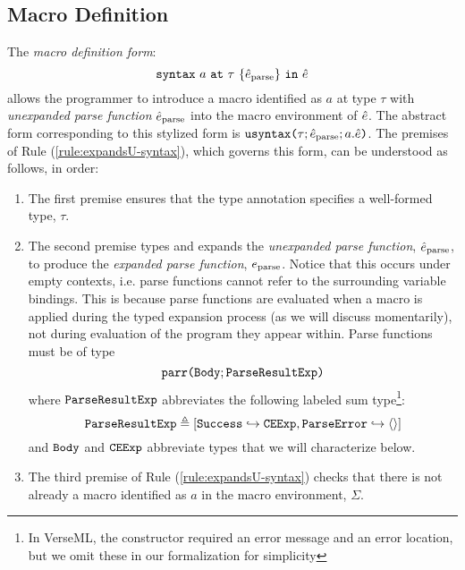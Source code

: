 \subsection{Macro Definition}
The \emph{macro definition form}: $$\texttt{syntax}~a~\texttt{at}~\tau~\{\hat{e}_\text{parse}\}~\texttt{in}~\hat{e}$$ allows the programmer to introduce a {macro} identified as $a$ at type $\tau$ with \emph{unexpanded parse function} $\hat{e}_\text{parse}$ into the macro environment of $\hat{e}$. The abstract form corresponding to this stylized form is $\texttt{usyntax}\texttt{(}\tau; \hat{e}_\text{parse}; a.\hat{e}\texttt{)}$. 
The premises of Rule (\ref{rule:expandsU-syntax}), which governs this form, can be understood as follows, in order:
\begin{enumerate}
\item The first premise ensures that the type annotation specifies a well-formed type, $\tau$.
\item The second premise types and expands the \emph{unexpanded parse function}, $\hat{e}_\text{parse}$, to produce the \emph{expanded parse function}, $e_\text{parse}$. Notice that this occurs under empty contexts, i.e. parse functions cannot refer to the surrounding variable bindings. This is because parse functions are evaluated when a macro is applied during the typed expansion process (as we will discuss momentarily), not during evaluation of the program they appear within. Parse functions must be of type \[\texttt{parr}\texttt{(}\mathtt{Body}; \mathtt{ParseResultExp}\texttt{)}\] where 
$\mathtt{ParseResultExp}$ abbreviates the following labeled sum type\footnote{In VerseML, the  constructor required an error message and an error location, but we omit these in our formalization for simplicity}:
\[
\mathtt{ParseResultExp} \triangleq [\mathtt{Success} \hookrightarrow \mathtt{CEExp}, \mathtt{ParseError} \hookrightarrow \langle  \rangle]
\] and 
 $\mathtt{Body}$ and $\mathtt{CEExp}$ abbreviate types that we will characterize below. 
\item The third premise of Rule (\ref{rule:expandsU-syntax}) checks that there is not already a macro identified as $a$ in the macro environment, $\Sigma$. 


\end{enumerate}
